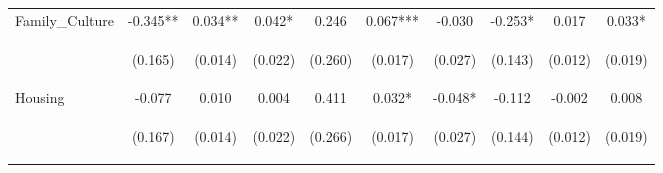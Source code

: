 \begin{tabular}{lccccccccc}
\noalign{\smallskip}Family_Culture & -0.345** & 0.034** & 0.042* & 0.246 & 0.067*** & -0.030 & -0.253* & 0.017 & 0.033*\\
 & \begin{footnotesize}(0.165)\end{footnotesize} & \begin{footnotesize}(0.014)\end{footnotesize} & \begin{footnotesize}(0.022)\end{footnotesize} & \begin{footnotesize}(0.260)\end{footnotesize} & \begin{footnotesize}(0.017)\end{footnotesize} & \begin{footnotesize}(0.027)\end{footnotesize} & \begin{footnotesize}(0.143)\end{footnotesize} & \begin{footnotesize}(0.012)\end{footnotesize} & \begin{footnotesize}(0.019)\end{footnotesize}\\
\noalign{\smallskip}Housing & -0.077 & 0.010 & 0.004 & 0.411 & 0.032* & -0.048* & -0.112 & -0.002 & 0.008\\
 & \begin{footnotesize}(0.167)\end{footnotesize} & \begin{footnotesize}(0.014)\end{footnotesize} & \begin{footnotesize}(0.022)\end{footnotesize} & \begin{footnotesize}(0.266)\end{footnotesize} & \begin{footnotesize}(0.017)\end{footnotesize} & \begin{footnotesize}(0.027)\end{footnotesize} & \begin{footnotesize}(0.144)\end{footnotesize} & \begin{footnotesize}(0.012)\end{footnotesize} & \begin{footnotesize}(0.019)\end{footnotesize}\\

\end{tabular}
